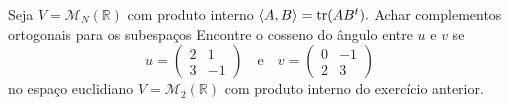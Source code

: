 \documentclass[11pt,a4paper]{article}
\begin{document}
 Seja $V = \mathcal{M}_N(\mathbb{R})$ com produto interno $\left\langle A,B \right\rangle = \mathrm{tr }(AB^t).$ Achar complementos ortogonais para os subespaços
\solucao{}
Encontre o cosseno do ângulo entre $u$ e $v$ se 
\[
u = \begin{pmatrix}
2 & 1 \\ 3 & -1
\end{pmatrix} \quad \mbox{e} \quad v = \begin{pmatrix}
0 & -1 \\ 2 & 3
\end{pmatrix}
\]
no espaço euclidiano $V = \mathcal{M}_2(\mathbb{R})$ com produto interno do exercício anterior.
\end{document}
